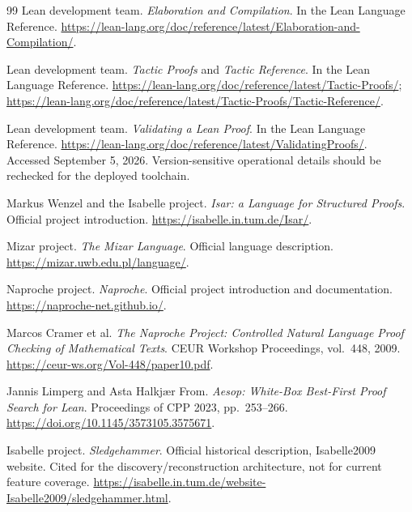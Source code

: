 \documentclass[11pt,letterpaper]{article}
\theoremstyle{remark}
\begin{document}
\begin{thebibliography}{99}
Lean development team.
\emph{Elaboration and Compilation}. In the Lean Language Reference.
\url{https://lean-lang.org/doc/reference/latest/Elaboration-and-Compilation/}.

Lean development team.
\emph{Tactic Proofs} and \emph{Tactic Reference}. In the Lean Language Reference.
\url{https://lean-lang.org/doc/reference/latest/Tactic-Proofs/};
\url{https://lean-lang.org/doc/reference/latest/Tactic-Proofs/Tactic-Reference/}.

Lean development team.
\emph{Validating a Lean Proof}. In the Lean Language Reference.
\url{https://lean-lang.org/doc/reference/latest/ValidatingProofs/}.
Accessed September 5, 2026. Version-sensitive operational details should be rechecked for the deployed toolchain.

Markus Wenzel and the Isabelle project.
\emph{Isar: a Language for Structured Proofs}. Official project introduction.
\url{https://isabelle.in.tum.de/Isar/}.

Mizar project.
\emph{The Mizar Language}. Official language description.
\url{https://mizar.uwb.edu.pl/language/}.

Naproche project.
\emph{Naproche}. Official project introduction and documentation.
\url{https://naproche-net.github.io/}.

Marcos Cramer et al.
\emph{The Naproche Project: Controlled Natural Language Proof Checking of Mathematical Texts}.
CEUR Workshop Proceedings, vol.~448, 2009.
\url{https://ceur-ws.org/Vol-448/paper10.pdf}.

Jannis Limperg and Asta Halkj\ae r From.
\emph{Aesop: White-Box Best-First Proof Search for Lean}.
Proceedings of CPP 2023, pp.~253--266.
\url{https://doi.org/10.1145/3573105.3575671}.

Isabelle project.
\emph{Sledgehammer}. Official historical description, Isabelle2009 website.
Cited for the discovery/reconstruction architecture, not for current feature coverage.
\url{https://isabelle.in.tum.de/website-Isabelle2009/sledgehammer.html}.
\end{thebibliography}
\end{document}
